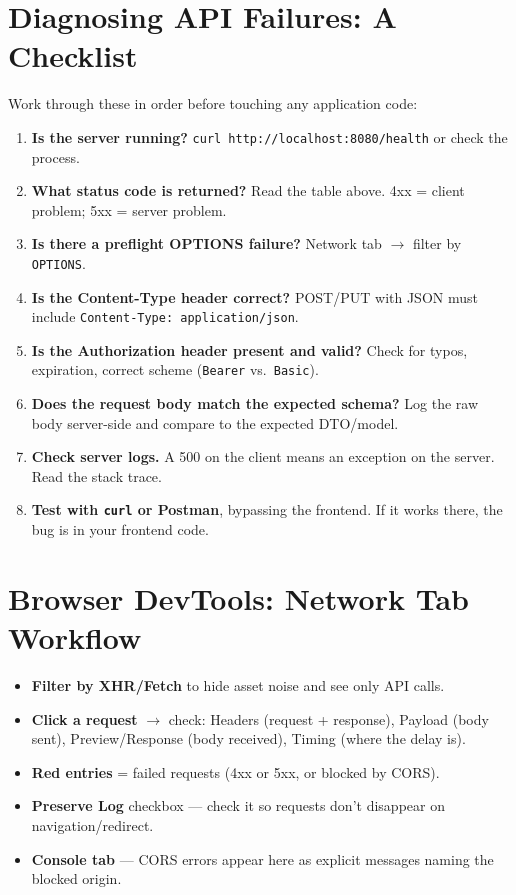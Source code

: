 \documentclass[11pt, letterpaper]{article}
\begin{document}
\section*{Diagnosing API Failures: A Checklist}

Work through these in order before touching any application code:

\begin{tcolorbox}[colback=part6bg, colframe=sectionred, arc=3pt, boxrule=1pt]
\begin{enumerate}[noitemsep, leftmargin=*]
  \item \textbf{Is the server running?} \texttt{curl http://localhost:8080/health} or check the process.
  \item \textbf{What status code is returned?} Read the table above. 4xx = client problem; 5xx = server problem.
  \item \textbf{Is there a preflight OPTIONS failure?} Network tab $\to$ filter by \texttt{OPTIONS}.
  \item \textbf{Is the Content-Type header correct?} POST/PUT with JSON must include \texttt{Content-Type: application/json}.
  \item \textbf{Is the Authorization header present and valid?} Check for typos, expiration, correct scheme (\texttt{Bearer} vs.\ \texttt{Basic}).
  \item \textbf{Does the request body match the expected schema?} Log the raw body server-side and compare to the expected DTO/model.
  \item \textbf{Check server logs.} A 500 on the client means an exception on the server. Read the stack trace.
  \item \textbf{Test with \texttt{curl} or Postman}, bypassing the frontend. If it works there, the bug is in your frontend code.
\end{enumerate}
\end{tcolorbox}

\section*{Browser DevTools: Network Tab Workflow}

\begin{itemize}[noitemsep]
  \item \textbf{Filter by XHR/Fetch} to hide asset noise and see only API calls.
  \item \textbf{Click a request} $\to$ check: Headers (request + response), Payload (body sent), Preview/Response (body received), Timing (where the delay is).
  \item \textbf{Red entries} = failed requests (4xx or 5xx, or blocked by CORS).
  \item \textbf{Preserve Log} checkbox --- check it so requests don't disappear on navigation/redirect.
  \item \textbf{Console tab} --- CORS errors appear here as explicit messages naming the blocked origin.
\end{itemize}
\end{document}
